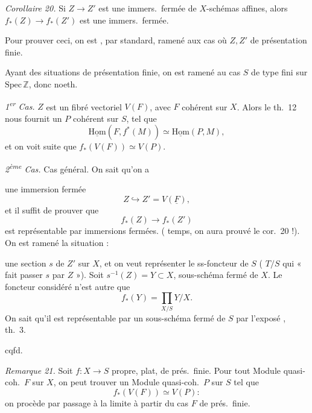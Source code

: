 \documentclass[11pt,a4paper]{article}
\begin{document}
\emph{Corollaire 20.} Si $Z \to Z'$ est une immers.\ fermée de $X$-schémas
affines, alors $f_{*}(Z) \to f_{*}(Z')$ est une immers.\ fermée.

Pour prouver ceci, on est \ill{}, par \ill{} standard, ramené aux cas où
$Z, Z'$ de présentation finie.

Ayant des situations de présentation finie, on est ramené au cas $S$ de type
fini sur $\mathrm{Spec}\,\mathbb{Z}$, donc noeth.

\emph{1\textsuperscript{er} Cas.} $Z$ est un fibré vectoriel $V(F)$, avec $F$
cohérent sur $X$. Alors le th.~12 nous fournit un $P$ cohérent sur $S$, tel
que
\[
  \underline{\mathrm{Hom}}(F, f^{*}(M)) \simeq \underline{\mathrm{Hom}}(P, M),
\]
et on voit  suite que $f_{*}(V(F)) \simeq V(P)$.

\emph{2\textsuperscript{ème} Cas.} Cas général. On sait qu'on a

une immersion fermée
\[
  Z \hookrightarrow Z' = V(\underline{F}),
\]
et il suffit de prouver que
\[
  f_{*}(Z) \to f_{*}(Z')
\]
est représentable par immersions fermées. ( temps, on
aura prouvé le cor.~20 !). On est ramené  la situation
 :



une section $s$ de $Z'$ sur $X$, et on veut représenter le ss-foncteur de $S$
( $T/S$ qui \struck{\ill{}} « fait passer $s$ par $Z$ »). Soit
$s^{-1}(Z) = Y \subset X$, sous-schéma fermé de $X$.  Le foncteur
considéré n'est autre que
\[
  f_{*}(Y) = \prod_{X/S} Y/X .
\]
On sait qu'il est représentable par un sous-schéma fermé de $S$ par l'exposé
, th.~3.

cqfd.

\emph{Remarque 21.} Soit $f \colon X \to S$ propre, plat, de prés.\ finie.
Pour tout Module quasi-coh.\ $F$ sur $X$, on peut trouver un Module
quasi-coh.\ $P$ sur $S$ tel que
\[
  f_{*}(V(F)) \simeq V(P) :
\]
on procède par passage à la limite à partir du cas $F$ de prés.\ finie.
\end{document}
